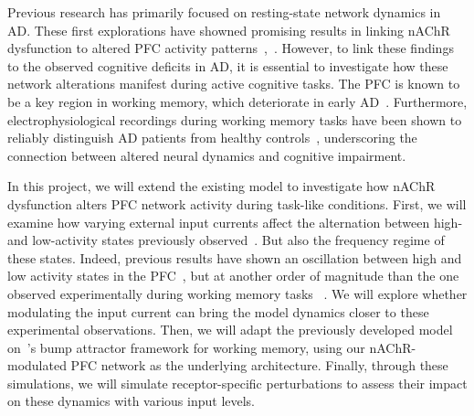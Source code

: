 \documentclass[11pt,a4paper]{article}
\begin{document}
Previous research has primarily focused on resting-state network dynamics in AD. These first explorations have showned promising results in linking nAChR dysfunction to altered PFC activity patterns~\cite{Rooy2021},~\cite{Koukouli2025}. However, to link these findings to the observed cognitive deficits in AD, it is essential to investigate how these network alterations manifest during active cognitive tasks.
The PFC is known to be a key region in working memory, which deteriorate in early AD~\cite{Huntley2010}. Furthermore, electrophysiological recordings during working memory tasks have been shown to reliably distinguish AD patients from healthy controls~\cite{Perpetuini2020}, underscoring the connection between altered neural dynamics and cognitive impairment.

In this project, we will extend the existing model to investigate how nAChR dysfunction alters PFC network activity during task-like conditions. First, we will examine how varying external input currents affect the alternation between high- and low-activity states previously observed~\cite{Rooy2021}. But also the frequency regime of these states. Indeed, previous results have shown an oscillation between high and low activity states in the PFC~\cite{Rooy2021}, but at another order of magnitude than the one observed experimentally during working memory tasks ~\cite{Compte2003}. We will explore whether modulating the input current can bring the model dynamics closer to these experimental observations.
Then, we will adapt the previously developed model on~\cite{Barbosa2020}'s bump attractor framework for working memory, using our nAChR-modulated PFC network as the underlying architecture. Finally, through these simulations, we will simulate receptor-specific perturbations to assess their impact on these dynamics with various input levels.
\end{document}
